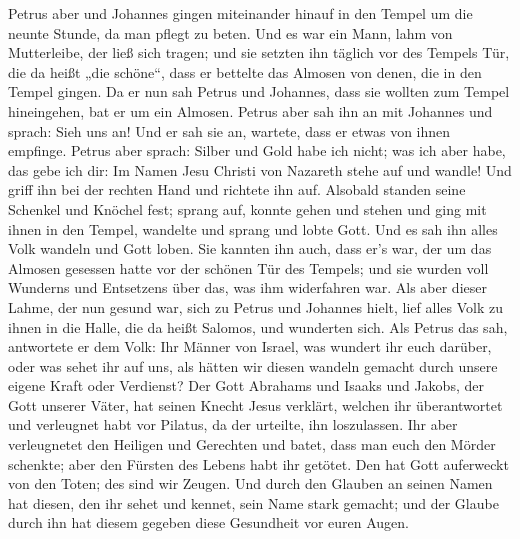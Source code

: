  Petrus aber und Johannes gingen miteinander hinauf in den
Tempel um die neunte Stunde, da man pflegt zu beten.  Und
es war ein Mann, lahm von Mutterleibe, der ließ sich tragen; und sie
setzten ihn täglich vor des Tempels Tür, die da heißt „die schöne``,
dass er bettelte das Almosen von denen, die in den Tempel gingen.
 Da er nun sah Petrus und Johannes, dass sie wollten zum
Tempel hineingehen, bat er um ein Almosen.  Petrus aber
sah ihn an mit Johannes und sprach: Sieh uns an!  Und er
sah sie an, wartete, dass er etwas von ihnen empfinge. 
Petrus aber sprach: Silber und Gold habe ich nicht; was ich aber habe,
das gebe ich dir: Im Namen Jesu Christi von Nazareth stehe auf und
wandle!  Und griff ihn bei der rechten Hand und richtete
ihn auf. Alsobald standen seine Schenkel und Knöchel fest;
 sprang auf, konnte gehen und stehen und ging mit ihnen in
den Tempel, wandelte und sprang und lobte Gott.  Und es
sah ihn alles Volk wandeln und Gott loben.  Sie kannten
ihn auch, dass er's war, der um das Almosen gesessen hatte vor der
schönen Tür des Tempels; und sie wurden voll Wunderns und Entsetzens
über das, was ihm widerfahren war.  Als aber dieser
Lahme, der nun gesund war, sich zu Petrus und Johannes hielt, lief alles
Volk zu ihnen in die Halle, die da heißt Salomos, und wunderten sich.
 Als Petrus das sah, antwortete er dem Volk: Ihr Männer
von Israel, was wundert ihr euch darüber, oder was sehet ihr auf uns,
als hätten wir diesen wandeln gemacht durch unsere eigene Kraft oder
Verdienst?  Der Gott Abrahams und Isaaks und Jakobs, der
Gott unserer Väter, hat seinen Knecht Jesus verklärt, welchen ihr
überantwortet und verleugnet habt vor Pilatus, da der urteilte, ihn
loszulassen.  Ihr aber verleugnetet den Heiligen und
Gerechten und batet, dass man euch den Mörder schenkte; 
aber den Fürsten des Lebens habt ihr getötet. Den hat Gott auferweckt
von den Toten; des sind wir Zeugen.  Und durch den
Glauben an seinen Namen hat diesen, den ihr sehet und kennet, sein Name
stark gemacht; und der Glaube durch ihn hat diesem gegeben diese
Gesundheit vor euren Augen.

